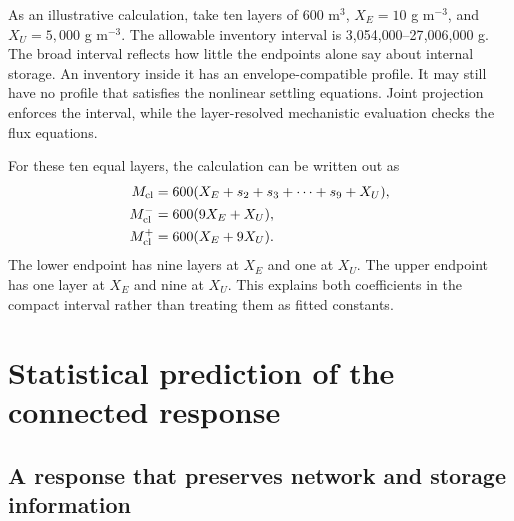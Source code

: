 As an illustrative calculation, take ten layers of 600 m$^3$, $X_E=10$ g m$^{-3}$, and $X_U=5{,}000$ g m$^{-3}$. The allowable inventory interval is 3{,}054{,}000--27{,}006{,}000 g. The broad interval reflects how little the endpoints alone say about internal storage. An inventory inside it has an envelope-compatible profile. It may still have no profile that satisfies the nonlinear settling equations. Joint projection enforces the interval, while the layer-resolved mechanistic evaluation checks the flux equations.

For these ten equal layers, the calculation can be written out as
\begin{align}
M_{\rm cl}&=600(X_E+s_2+s_3+\cdots+s_9+X_U),\\
M_{\rm cl}^{-}&=600(9X_E+X_U),\\
M_{\rm cl}^{+}&=600(X_E+9X_U).
\end{align}
The lower endpoint has nine layers at $X_E$ and one at $X_U$. The upper endpoint has one layer at $X_E$ and nine at $X_U$. This explains both coefficients in the compact interval rather than treating them as fitted constants.

\section{Statistical prediction of the connected response}

\subsection{A response that preserves network and storage information}

